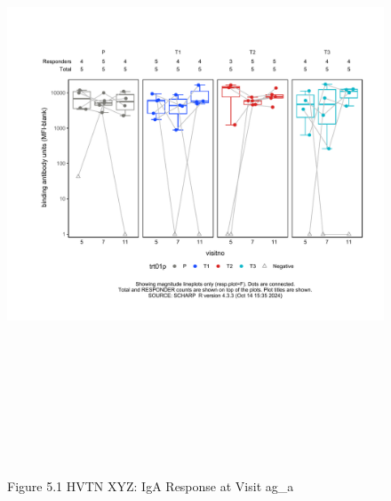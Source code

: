 \documentclass[12pt]{article}
\begin{document}
\begin{figure}[H]

{\centering \includegraphics[width=8.75in,height=7.25in]{test_cases_files/figure-latex/unnamed-chunk-10-1} 

}

\caption[Figure 5.1 lineplot (pos. response boxplots)]{Figure 5.1 HVTN XYZ: IgA Response at Visit ag\_a}\label{fig:unnamed-chunk-10}
\end{figure}
\clearpage
\end{document}
